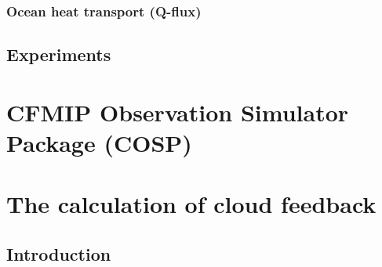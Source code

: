 \subsubsection{Ocean heat transport (Q-flux)}


\subsection{Experiments}


\section{CFMIP Observation Simulator Package (COSP)}
\label{sec:cosp}

\section{The calculation of cloud feedback}
\label{sec:method_cloud_fbk}

\subsection{Introduction}

